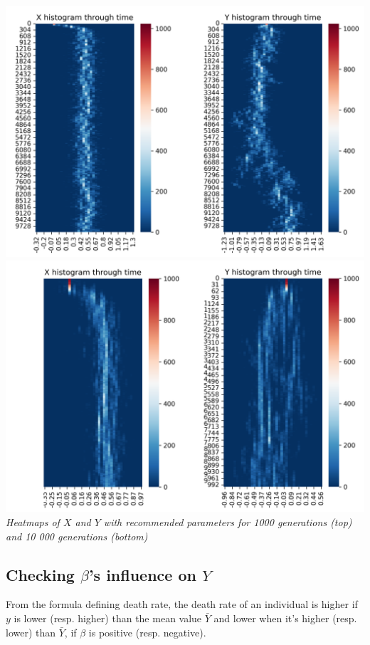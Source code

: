 \documentclass{article}
\begin{document}
\begin{center}
\includegraphics[scale=0.5]{10000} \\
\includegraphics[scale=0.5]{1000} \\
\textit{Heatmaps of $X$ and $Y$ with recommended parameters for 1000 generations (top) and 10 000 generations (bottom)}
\end{center}

\subsection{Checking $\beta$'s influence on $Y$}

From the formula defining death rate, the death rate of an individual is higher if $y$ is lower (resp. higher) than the mean value $\bar{Y}$ and lower when it's higher (resp. lower) than $\bar{Y}$, if $\beta$ is positive (resp. negative). \\
\vspace{5mm}
\end{document}
